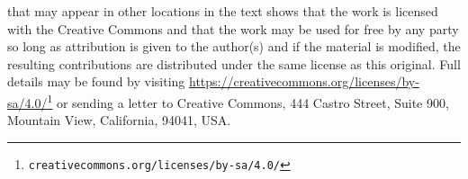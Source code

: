\documentclass[oneside,10pt,]{book}
\numberwithin{equation}{section}
\begin{document}
 that may appear in other locations in the text shows that the work is licensed with the Creative Commons and that the work may be used for free by any party so long as attribution is given to the author(s) and if the material is modified, the resulting contributions are distributed under the same license as this original. Full details may be found by visiting \href{https://creativecommons.org/licenses/by-sa/4.0/}{https:\slash{}\slash{}creativecommons.org\slash{}licenses\slash{}by-sa\slash{}4.0\slash{}}\footnote{\nolinkurl{creativecommons.org/licenses/by-sa/4.0/}\label{fn-root--a-b-b-b-c-c-e}}  or sending a letter to Creative Commons, 444 Castro Street, Suite 900, Mountain View, California, 94041, USA.\par\medskip
{}
\null\clearpage
%
%
\typeout{************************************************}
\typeout{************************************************}
%
\end{document}
